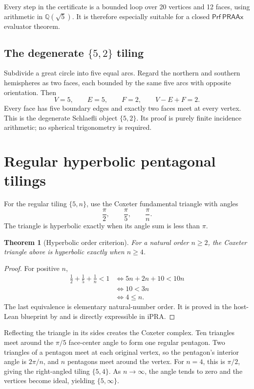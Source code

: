 \documentclass[11pt]{article}
\newtheorem{theorem}{Theorem}[section]
\theoremstyle{remark}
\newcommand{\Q}{\mathbb Q}
\newcommand{\ipra}{\mathrm{iPRA}}
\newcommand{\code}[1]{\texttt{\detokenize{#1}}}
\newcommand{\Qsqrt}[1]{\Q(\sqrt{#1})}
\newcommand{\Prf}{\mathsf{Prf}}
\newcommand{\PRAAx}{\mathsf{PRAAx}}
\begin{document}
Every step in the certificate is a bounded loop over 20 vertices and 12 faces,
using arithmetic in \(\Qsqrt5\).  It is therefore especially suitable for a
closed \(\Prf\ \PRAAx\) evaluator theorem.

\subsection{The degenerate \texorpdfstring{\(\{5,2\}\)}{\{5,2\}} tiling}

Subdivide a great circle into five equal arcs.  Regard the northern and
southern hemispheres as two faces, each bounded by the same five arcs with
opposite orientation.  Then
\[
 V=5,\qquad E=5,\qquad F=2,
 \qquad V-E+F=2.
\]
Every face has five boundary edges and exactly two faces meet at every vertex.
This is the degenerate Schlaefli object \(\{5,2\}\).  Its proof is purely
finite incidence arithmetic; no spherical trigonometry is required.

\section{Regular hyperbolic pentagonal tilings}
\label{sec:hyperbolic}

For the regular tiling \(\{5,n\}\), use the Coxeter fundamental triangle with
angles
\[
 \frac\pi2,\qquad \frac\pi5,\qquad \frac\pi n.
\]
The triangle is hyperbolic exactly when its angle sum is less than \(\pi\).

\begin{theorem}[Hyperbolic order criterion]
\label{thm:hyperbolic-order}
For a natural order \(n\geq2\), the Coxeter triangle above is hyperbolic
exactly when \(n\geq4\).
\end{theorem}

\begin{proof}
For positive \(n\),
\begin{align*}
 \frac12+\frac15+\frac1n<1
 &\iff 5n+2n+10<10n\\
 &\iff 10<3n\\
 &\iff 4\leq n.
\end{align*}
The last equivalence is elementary natural-number order.  It is proved in the
host-Lean blueprint by \code{omega} and is directly expressible in
\(\ipra\).
\end{proof}

Reflecting the triangle in its sides creates the Coxeter complex.  Ten
triangles meet around the \(\pi/5\) face-center angle to form one regular
pentagon.  Two triangles of a pentagon meet at each original vertex, so the
pentagon's interior angle is \(2\pi/n\), and \(n\) pentagons meet around the
vertex.  For \(n=4\), this is \(\pi/2\), giving the right-angled tiling
\(\{5,4\}\).  As \(n\to\infty\), the angle tends to zero and the vertices
become ideal, yielding \(\{5,\infty\}\).
\end{document}
